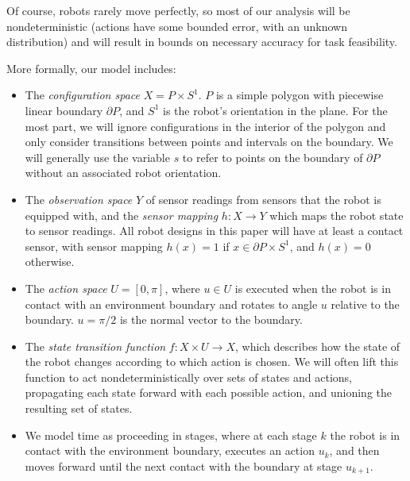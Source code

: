 \documentclass[]{svproc}  %
\begin{document}
Of course, robots rarely move perfectly, so most of our analysis will be
nondeterministic (actions have some bounded error, with an unknown
distribution) and will result in bounds on necessary accuracy for task
feasibility.

More formally, our model includes:

\begin{itemize}
\item The \emph{configuration space} $X = P \times S^1$. $P$ is a simple polygon with 
piecewise linear boundary $\partial P$, and $S^1$ is the robot's orientation in the plane. For the most part, we will ignore configurations in the interior
of the polygon and only consider transitions between points and intervals on the
boundary. We will generally use the variable $s$ to refer to points on
the boundary of $\partial P$ without an associated robot orientation.
\item The \emph{observation space} $Y$ of sensor readings from sensors that the
robot is equipped with, and the \emph{sensor mapping} $h: X \to Y$ which maps
the robot state to sensor readings. All robot designs in this paper will have at
least a contact sensor, with sensor mapping $h(x) = 1$ if $x \in \partial
P \times S^1$, and $h(x) = 0$ otherwise.
\item The \emph{action space} $U = [0,\pi]$, where $u \in U$ is executed when
the robot is in contact with an environment boundary and rotates to angle $u$
relative to the boundary. $u = \pi/2$ is the normal vector to the boundary.
\item The \emph{state transition function} $f: X \times U \to X$, which
describes how the state of the robot changes according to which action is
chosen. We will often lift this function to act nondeterministically over sets
of states and actions, propagating each state forward with each possible action,
and unioning the resulting set of states.
\item We model time as proceeding in stages, where at each stage $k$ the robot
is in contact with the environment boundary, executes an action $u_k$, and then
moves forward until the next contact with the boundary at stage $u_{k+1}$.
\end{itemize}
\end{document}
